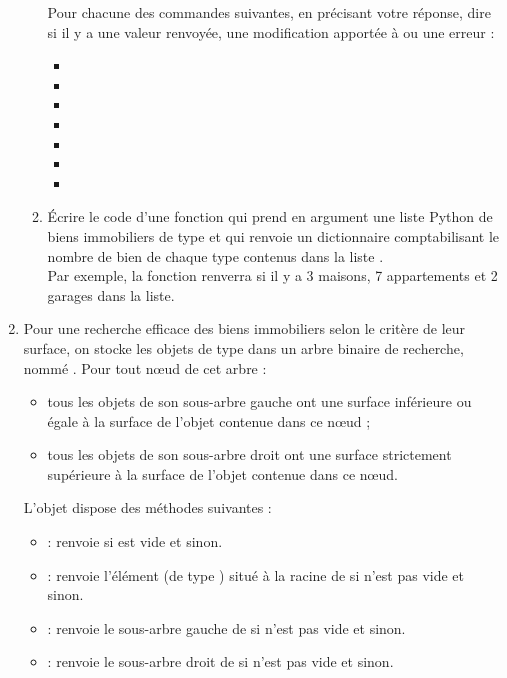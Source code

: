 \documentclass[11pt,a4paper,french,twoside]{PMCours}
\begin{document}
\begin{enumerate}
\begin{enumerate}
Pour chacune des commandes suivantes, en précisant votre réponse, dire si il y a une valeur renvoyée, une modification apportée à  ou une erreur : 
\begin{itemize} 
\item {}
\item {}
\item {}
\item {}
\item {}
\item {}
\item {}
\end{itemize} 
\item Écrire le code d'une fonction  qui prend en argument une liste Python de biens immobiliers de type  et qui renvoie un dictionnaire comptabilisant le nombre de bien de chaque type contenus dans la liste .\\
Par exemple, la fonction renverra  si il y a 3 maisons, 7 appartements et 2 garages dans la liste.
\end{enumerate}    
\item Pour une recherche efficace des biens immobiliers selon le critère de leur surface, on
stocke les objets de type  dans un arbre binaire de recherche, nommé . Pour tout
nœud de cet arbre :
\begin{itemize}
\item tous les objets de son sous-arbre gauche ont une surface inférieure ou égale à la
surface de l'objet contenue dans ce nœud ;
\item tous les objets de son sous-arbre droit ont une surface strictement supérieure à la
surface de l'objet contenue dans ce nœud.
\end{itemize}

L'objet  dispose des méthodes suivantes :
\begin{itemize}
\item[]  : renvoie  si  est vide et  sinon.
\item[]  : renvoie l'élément (de type ) situé à la racine de  si  n'est
pas vide et  sinon.
\item[]  : renvoie le sous-arbre gauche de  si  n'est pas vide et 
sinon.
\item[]  : renvoie le sous-arbre droit de  si  n'est pas vide et  sinon.
\end{itemize}


\end{enumerate}
\end{document}
